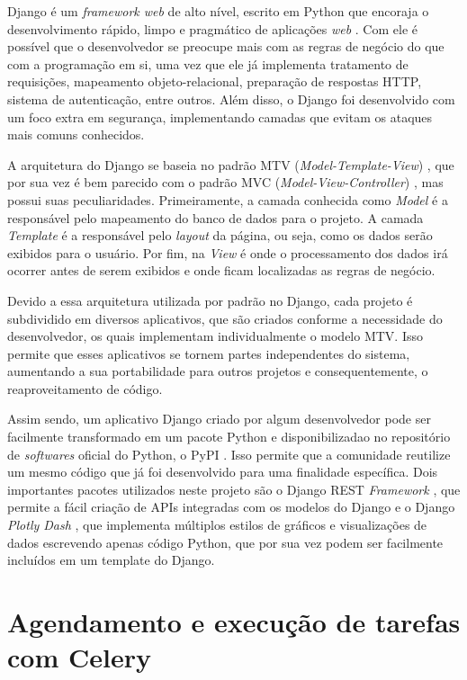 \indent
\par Django é um \textit{framework web} de alto nível, escrito em Python que encoraja o desenvolvimento rápido, limpo e pragmático de aplicações \textit{web} \cite{Django}. Com ele é possível que o desenvolvedor se preocupe mais com as regras de negócio do que com a programação em si, uma vez que ele já implementa tratamento de requisições, mapeamento objeto-relacional, preparação de respostas HTTP, sistema de autenticação, entre outros. Além disso, o Django foi desenvolvido com um foco extra em segurança, implementando camadas que evitam os ataques mais comuns conhecidos.
\indent
\par A arquitetura do Django se baseia no padrão MTV (\textit{Model-Template-View}) \cite{MTV}, que por sua vez é bem parecido com o padrão MVC (\textit{Model-View-Controller}) \cite{MVC}, mas possui suas peculiaridades. Primeiramente, a camada conhecida como \textit{Model} é a responsável pelo mapeamento do banco de dados para o projeto. A camada \textit{Template} é a responsável pelo \textit{layout} da página, ou seja, como os dados serão exibidos para o usuário. Por fim, na \textit{View} é onde o processamento dos dados irá ocorrer antes de serem exibidos e onde ficam localizadas as regras de negócio.
\indent
\par Devido a essa arquitetura utilizada por padrão no Django, cada projeto é subdividido em diversos aplicativos, que são criados conforme a necessidade do desenvolvedor, os quais implementam individualmente o modelo MTV. Isso permite que esses aplicativos se tornem partes independentes do sistema, aumentando a sua portabilidade para outros projetos e consequentemente, o reaproveitamento de código.
\indent
\par Assim sendo, um aplicativo Django criado por algum desenvolvedor pode ser facilmente transformado em um pacote Python e disponibilizadao no repositório de \textit{softwares} oficial do Python, o PyPI \cite{PYPI}. Isso permite que a comunidade reutilize um mesmo código que já foi desenvolvido para uma finalidade específica. Dois importantes pacotes utilizados neste projeto são o Django REST \textit{Framework} \cite{DjangoRF}, que permite a fácil criação de APIs integradas com os modelos do Django e o Django \textit{Plotly Dash} \cite{DjangoPD}, que implementa múltiplos estilos de gráficos e visualizações de dados escrevendo apenas código Python, que por sua vez podem ser facilmente incluídos em um template do Django.

\section{Agendamento e execução de tarefas com Celery}


